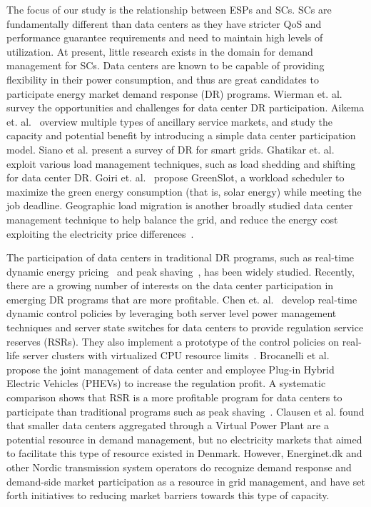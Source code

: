 The focus of our study is the relationship between ESPs and SCs. SCs are fundamentally different than data centers as they have stricter QoS and performance guarantee requirements and need to maintain high levels of utilization. At present, little research exists in the domain for demand management for SCs.  Data centers are known to be capable of providing flexibility in their power consumption, and thus are great candidates to participate energy market demand response (DR) programs. Wierman et. al.~\cite{WiermanIGCC} survey the opportunities and challenges for data center DR participation. Aikema et. al.~\cite{aikema2012data} overview multiple types of ancillary service markets, and study the capacity and potential benefit by introducing a simple data center participation model. Siano et al. \cite{siano2014demand} present a survey of DR for smart grids. Ghatikar et. al.~\cite{ghatikar2012demand} exploit various load management techniques, such as load shedding and shifting for data center DR. Goiri et. al.~\cite{goiri2015matching} propose GreenSlot, a workload scheduler to maximize the green energy consumption (that is, solar energy) while meeting the job deadline. Geographic load migration is another broadly studied data center management technique to help balance the grid, and reduce the energy cost exploiting the electricity price differences~\cite{wangexploring,wang2013data,chiu2012electric,liu2011greening,lin2012online}.

The participation of data centers in traditional DR programs, such as real-time dynamic energy pricing~\cite{wang2013sequential,ghamkhari2012data,liu2014pricing} and peak shaving~\cite{urgaonkar2011optimal,PSUSigmetrics12,aksanli2013architecting}, has been widely studied. Recently, there are a growing number of interests on the data center participation in emerging DR programs that are more profitable. Chen et. al.~\cite{chenASPDAC} develop real-time dynamic control policies by leveraging both server level power management techniques and server state switches for data centers to provide regulation service reserves (RSRs). They also implement a prototype of the control policies on real-life server clusters with virtualized CPU resource limits~\cite{chendynamic}. Brocanelli et al.~\cite{brocanelli2013joint} propose the joint management of data center and employee Plug-in Hybrid Electric Vehicles (PHEVs) to increase the regulation profit. A systematic comparison shows that RSR is a more profitable program for data centers to participate than traditional programs such as peak shaving~\cite{chenIGCC}. Clausen et al. \cite{clausen2014load} found that smaller data centers aggregated through a Virtual Power Plant are a potential resource in demand management, but no electricity markets that aimed to facilitate this type of resource existed in Denmark. However, Energinet.dk and other Nordic transmission system operators do recognize demand response and demand-side market participation as a resource in grid management, and have set forth initiatives to reducing market barriers towards this type of capacity.  

